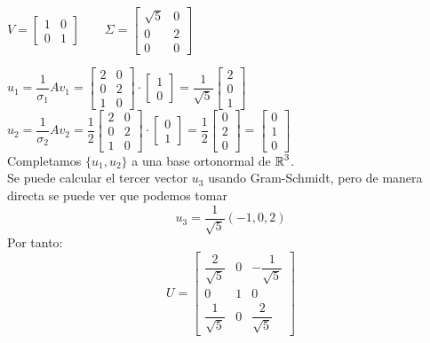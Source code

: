 \begin{enumerate}[label=\color{red}\textbf{\arabic*)}, leftmargin=*]
		$V=\begin{bmatrix}
			1 & 0\\
			0 & 1
		\end{bmatrix}\qquad\Sigma=\begin{bmatrix}
		\sqrt{5} & 0 \\
		0 & 2\\
		0 & 0
		\end{bmatrix}$
		
		
		$u_1=\dfrac{1}{\sigma_1}Av_1=\begin{bmatrix}
			2 & 0\\
			0 & 2\\
			1 & 0
		\end{bmatrix}\cdot\begin{bmatrix}
		1\\
		0
		\end{bmatrix}=\dfrac{1}{\sqrt{5}}\begin{bmatrix}
		2\\
		0\\
		1
		\end{bmatrix}$\\
		$u_2=\dfrac{1}{\sigma_2}Av_2=\dfrac{1}{2}\begin{bmatrix}
			2 & 0\\
			0 & 2\\
			1 & 0
		\end{bmatrix}\cdot\begin{bmatrix}
		0\\
		1
		\end{bmatrix}=\dfrac{1}{2}\begin{bmatrix}
		0\\
		2\\
		0
		\end{bmatrix}=\begin{bmatrix}
		0\\
		1\\
		0
		\end{bmatrix}$\\
		Completamos $\{u_1,u_2\}$ a una base ortonormal de $\operatorname{\mathbb{R}}^3$.\\
		Se puede calcular el tercer vector $u_3$ usando Gram-Schmidt, pero de manera directa se puede ver que podemos tomar \[ u_3=\dfrac{1}{\sqrt{5}}(-1,0,2) \]Por tanto: \[ U=\begin{bmatrix}
			\dfrac{2}{\sqrt{5}} & 0 & -\dfrac{1}{\sqrt{5}}\\
			0 & 1 & 0\\
			\dfrac{1}{\sqrt{5}} & 0 & \dfrac{2}{\sqrt{5}}

\end{bmatrix}\]
\end{enumerate}
